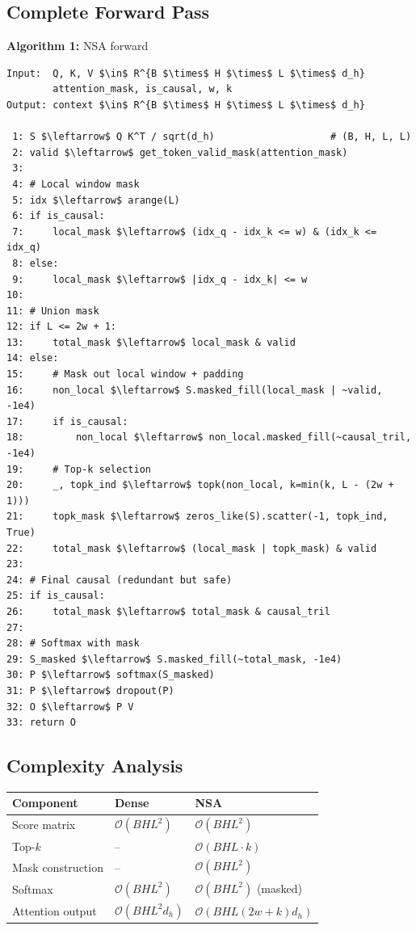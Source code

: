 \subsection{Complete Forward Pass}

\textbf{Algorithm 1:} NSA forward
\begin{lstlisting}
Input:  Q, K, V $\in$ R^{B $\times$ H $\times$ L $\times$ d_h}
        attention_mask, is_causal, w, k
Output: context $\in$ R^{B $\times$ H $\times$ L $\times$ d_h}

 1: S $\leftarrow$ Q K^T / sqrt(d_h)                    # (B, H, L, L)
 2: valid $\leftarrow$ get_token_valid_mask(attention_mask)
 3:
 4: # Local window mask
 5: idx $\leftarrow$ arange(L)
 6: if is_causal:
 7:     local_mask $\leftarrow$ (idx_q - idx_k <= w) & (idx_k <= idx_q)
 8: else:
 9:     local_mask $\leftarrow$ |idx_q - idx_k| <= w
10:
11: # Union mask
12: if L <= 2w + 1:
13:     total_mask $\leftarrow$ local_mask & valid
14: else:
15:     # Mask out local window + padding
16:     non_local $\leftarrow$ S.masked_fill(local_mask | ~valid, -1e4)
17:     if is_causal:
18:         non_local $\leftarrow$ non_local.masked_fill(~causal_tril, -1e4)
19:     # Top-k selection
20:     _, topk_ind $\leftarrow$ topk(non_local, k=min(k, L - (2w + 1)))
21:     topk_mask $\leftarrow$ zeros_like(S).scatter(-1, topk_ind, True)
22:     total_mask $\leftarrow$ (local_mask | topk_mask) & valid
23:
24: # Final causal (redundant but safe)
25: if is_causal:
26:     total_mask $\leftarrow$ total_mask & causal_tril
27:
28: # Softmax with mask
29: S_masked $\leftarrow$ S.masked_fill(~total_mask, -1e4)
30: P $\leftarrow$ softmax(S_masked)
31: P $\leftarrow$ dropout(P)
32: O $\leftarrow$ P V
33: return O
\end{lstlisting}

\subsection{Complexity Analysis}

\begin{table}[H]
\centering
\small
\begin{tabular}{lll}
\toprule
\textbf{Component} & \textbf{Dense} & \textbf{NSA} \\
\midrule
Score matrix & $\mathcal{O}(B H L^2)$ & $\mathcal{O}(B H L^2)$ \\
Top-$k$ & -- & $\mathcal{O}(B H L \cdot k)$ \\
Mask construction & -- & $\mathcal{O}(B H L^2)$ \\
Softmax & $\mathcal{O}(B H L^2)$ & $\mathcal{O}(B H L^2)$ (masked) \\
Attention output & $\mathcal{O}(B H L^2 d_h)$ & $\mathcal{O}(B H L (2w+k) d_h)$ \\
\bottomrule
\end{tabular}
\end{table}

